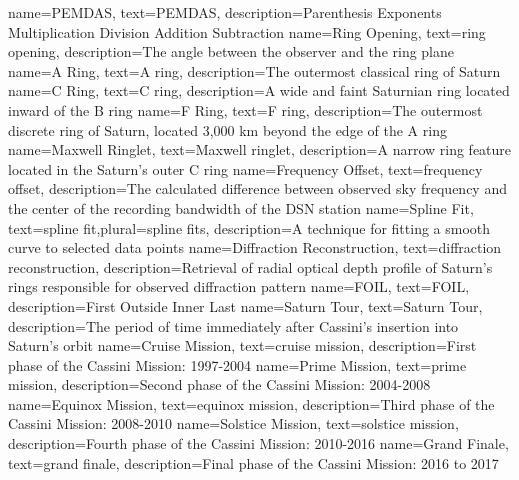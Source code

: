 {
    name={PEMDAS},
    text={PEMDAS},
    description={Parenthesis Exponents Multiplication
                 Division Addition Subtraction}
}
{
    name={Ring Opening},
    text={ring opening},
    description={The angle between the observer and the ring plane}
}
{
    name={A Ring},
    text={A ring},
    description={The outermost classical ring of Saturn}
}
{
    name={C Ring},
    text={C ring},
    description={A wide and faint Saturnian ring located inward of the B ring}
}
{
    name={F Ring},
    text={F ring},
    description={The outermost discrete ring of Saturn, located 3,000 km beyond the edge of the A ring}
}
{
    name={Maxwell Ringlet},
    text={Maxwell ringlet},
    description={A narrow ring feature located in the Saturn's outer C ring}
}
{
    name={Frequency Offset},
    text={frequency offset},
    description={The calculated difference between observed sky frequency and the center of the recording bandwidth of the DSN station}
}
{
    name={Spline Fit},
    text={spline fit},plural={spline fits},
    description={A technique for fitting a smooth curve to selected data points}
}
{
    name={Diffraction Reconstruction},
    text={diffraction reconstruction},
    description={Retrieval of radial optical depth profile of Saturn's rings responsible for observed diffraction pattern}
}
{
    name={FOIL},
    text={FOIL},
    description={First Outside Inner Last}
}
{
    name={Saturn Tour},
    text={Saturn Tour},
    description={The period of time immediately after Cassini's insertion into Saturn's orbit}
}
{
    name={Cruise Mission},
    text={cruise mission},
    description={First phase of the Cassini Mission: 1997-2004}
}
{
    name={Prime Mission},
    text={prime mission},
    description={Second phase of the Cassini Mission: 2004-2008}
}
{
    name={Equinox Mission},
    text={equinox mission},
    description={Third phase of the Cassini Mission: 2008-2010}
}
{
    name={Solstice Mission},
    text={solstice mission},
    description={Fourth phase of the Cassini Mission: 2010-2016}
}
{
    name={Grand Finale},
    text={grand finale},
    description={Final phase of the Cassini Mission: 2016 to 2017}
}
